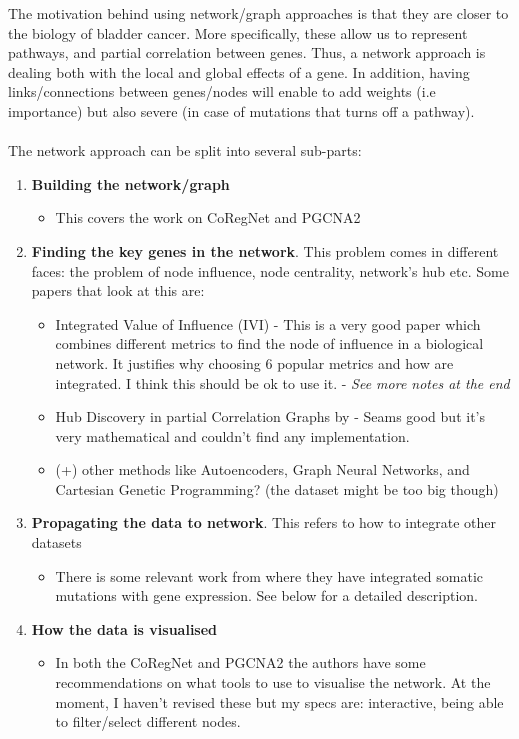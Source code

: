 The motivation behind using network/graph approaches is that they are closer to the biology of bladder cancer. More specifically, these allow us to represent pathways, and partial correlation between genes. Thus, a network approach is dealing both with the local and global effects of a gene. In addition, having links/connections between genes/nodes will enable to add weights (i.e importance) but also severe (in case of mutations that turns off a pathway).
\\~\\
The network approach can be split into several sub-parts:
\begin{enumerate}
    \item \textbf{Building the network/graph}
    \begin{itemize}
        \item This covers the work on CoRegNet \citet{Nicolle2015-tn} and PGCNA2 \citet{Care2019-ij}
    \end{itemize}
    \item \textbf{Finding the key genes in the network}. This problem comes in different faces: the problem of node influence, node centrality, network's hub etc. Some papers that look at this are:
    \begin{itemize}
        \item Integrated Value of Influence (IVI) \citet{Salavaty2020-wo} - This is a very good paper which combines different metrics to find the node of influence in a biological network. It justifies why choosing 6 popular metrics and how are integrated. I think this should be ok to use it.  - \textit{See more notes at the end}
        \item Hub Discovery in partial Correlation Graphs by \citet{Hero2012-ch} - Seams good but it's very mathematical and couldn't find any implementation.
        \item (+) other methods like Autoencoders, Graph Neural Networks, and Cartesian Genetic Programming? (the dataset might be too big though)
    \end{itemize}
    \item \textbf{Propagating the data to network}. This refers to how to integrate other datasets 
    \begin{itemize}
        \item There is some relevant work from \citet{He2017-dj} where they have integrated somatic mutations with gene expression. See below for a detailed description.
    \end{itemize}
    \item \textbf{How the data is visualised}
    \begin{itemize}
        \item In both the CoRegNet and PGCNA2 the authors have some recommendations on what tools to use to visualise the network. At the moment, I haven't revised these but my specs are: interactive, being able to filter/select different nodes.
    \end{itemize}
\end{enumerate}


